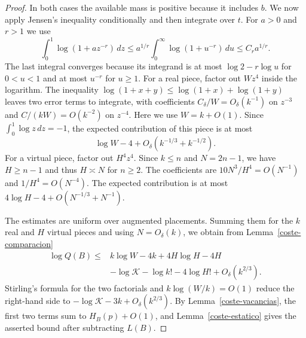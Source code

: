 \begin{proof}
In both cases the available mass is positive because it includes $b$. We now apply Jensen's
inequality conditionally and then integrate over $t$. For $a>0$ and $r>1$ we use
\[
 \int_0^1\log(1+a z^{-r})\,dz
 \le a^{1/r}\int_0^\infty\log(1+u^{-r})\,du
 \le C_r a^{1/r}.
\]
The last integral converges because its integrand is at most $\log 2-r\log u$ for $0<u<1$
and at most $u^{-r}$ for $u\ge1$. For a real piece, factor out $Wz^4$ inside the logarithm.
The inequality $\log(1+x+y)\le\log(1+x)+\log(1+y)$ leaves two error terms to integrate, with
coefficients $C_\delta/W=O_\delta(k^{-1})$ on $z^{-3}$ and $C/(kW)=O(k^{-2})$ on $z^{-4}$.
Here we use $W=k+O(1)$. Since $\int_0^1\log z\,dz=-1$, the expected contribution of this piece
is at most
\[
 \log W-4+O_\delta(k^{-1/3}+k^{-1/2}).
\]
For a virtual piece, factor out $H^4z^4$. Since $k\le n$ and $N=2n-1$, we have $H\ge n-1$
and thus $H\asymp N$ for $n\ge2$. The coefficients are $10N^3/H^4=O(N^{-1})$ and
$1/H^4=O(N^{-4})$. The expected contribution is at most $4\log H-4+O(N^{-1/3}+N^{-1})$.

The estimates are uniform over augmented placements. Summing them for the $k$ real and $H$ virtual
pieces and using $N=O_\delta(k)$, we obtain from Lemma~\ref{coste-comparacion}
\[
 \begin{split}
 \log Q(B)\le {}&
 k\log W-4k+4H\log H-4H\\
 &-\log\mathcal K-\log k!-4\log H!+O_\delta(k^{2/3}).
 \end{split}
\]
Stirling's formula for the two factorials and $k\log(W/k)=O(1)$ reduce the right-hand side to
$-\log\mathcal K-3k+O_\delta(k^{2/3})$. By Lemma~\ref{coste-vacancias}, the first two terms sum
to $H_B(p)+O(1)$, and Lemma~\ref{coste-estatico} gives the asserted bound after subtracting $L(B)$.
\end{proof}
